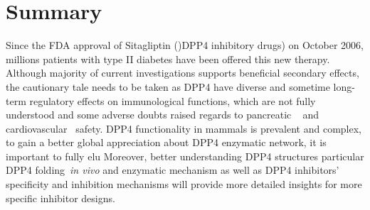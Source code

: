 \section{\label{chap:Sum} Summary}
Since the FDA approval of Sitagliptin ()DPP4 inhibitory drugs) on October 2006, millions patients with type II diabetes have been offered this new therapy. Although majority of current investigations supports beneficial secondary effects, the cautionary tale needs to be taken as DPP4 have diverse and sometime long-term regulatory effects on immunological functions, which are not fully understood and some adverse doubts raised regards to pancreatic ~\cite{Egan2014, Jermendy2016} and cardiovascular~\cite{Scirica2013} safety. DPP4 functionality in mammals is prevalent and complex, to gain a better global appreciation about DPP4 enzymatic network, it is important to fully elu   Moreover, better understanding DPP4 structures particular DPP4 folding~\textit{in vivo} and enzymatic mechanism as well as DPP4 inhibitors' specificity and inhibition mechanisms will provide more detailed insights for more specific inhibitor designs. 

